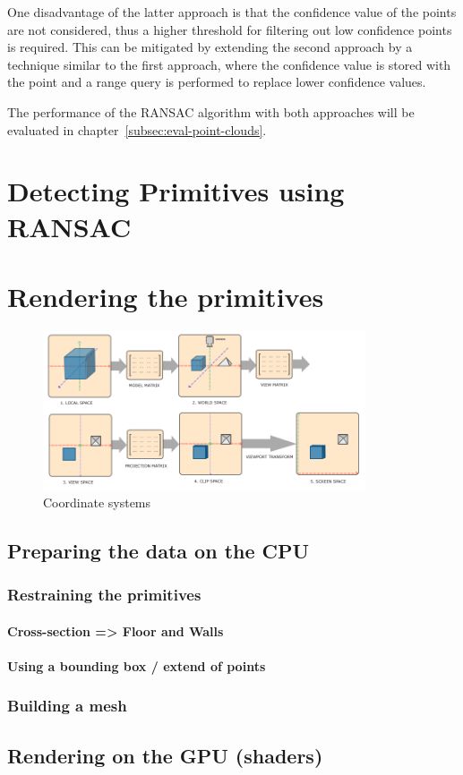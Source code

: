 One disadvantage of the latter approach is that the confidence value of the points are not considered,
thus a higher threshold for filtering out low confidence points is required.
This can be mitigated by extending the second approach by a technique similar to the first approach,
where the confidence value is stored with the point and a range query is performed to replace lower confidence values.

The performance of the RANSAC algorithm with both approaches will be evaluated in chapter~\ref{subsec:eval-point-clouds}.


\section{Detecting Primitives using RANSAC}

\parencite{schnabel_efficient_2007}


\section{Rendering the primitives}\label{sec:rendering-the-primitives}

\begin{figure}[h]
    \centering
    \includegraphics[width=0.85\textwidth]{images/coordinate_systems}
    \caption{Coordinate systems}
    \label{fig:coordinate-systems}
\end{figure}

\parencite{de_vries_learn_2020}

\subsection{Preparing the data on the CPU}

\subsubsection{Restraining the primitives}

\paragraph{Cross-section => Floor and Walls}

\paragraph{Using a bounding box / extend of points}

\subsubsection{Building a mesh}

\subsection{Rendering on the GPU (shaders)}
